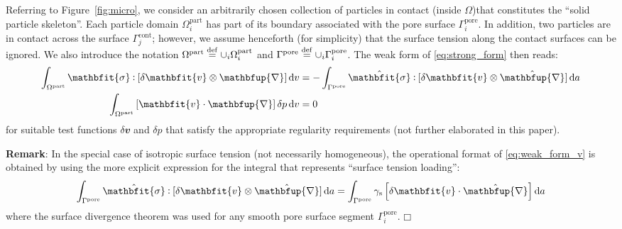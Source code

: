\documentclass[12pt,a4paper,fleqn]{article}
\renewcommand{\ta}[1]{\mathbfit{#1}}
\renewcommand{\ts}[1]{\mathbfit{#1}}
\renewcommand{\diff}{\mathbfup{\nabla}}
\renewcommand{\Box}{\mdlgwhtsquare}
\newcommand{\figref}[1]{Figure~\ref{#1}}
\newcommand{\pore}{\mathrm{pore}}
\newcommand{\particle}{\mathrm{part}}
\newcommand{\contact}{\mathrm{cont}}
\newcommand{\internal}{\mathrm{int}}
\newcommand{\surf}{\mathrm{s}}
\begin{document}

Referring to \figref{fig:micro}, we consider an arbitrarily chosen collection of particles in contact (inside $\Omega$)that constitutes the ``solid particle skeleton''.
Each particle domain $\Omega_i^\particle$ has part of its boundary associated with the pore surface $\Gamma_i^\pore$.
In addition, two particles are in contact across the surface $\Gamma_j^\contact$; however, we assume henceforth (for simplicity) that the surface tension along the contact surfaces can be ignored. We also introduce the notation $\Omega^\particle \defeq\cup_i\Omega_i^\particle$ and $\Gamma^\pore \defeq \cup_i\Gamma^\pore_i$.
The weak form of \eqref{eq:strong_form} then reads:
\begin{subequations}\label{eq:weak_form}
\begin{align}
    \int_{\Omega^\particle} \ts{\sigma}\dprod[\delta \ta v\outerp\diff] \dif v
    & =
    -\int_{\Gamma^\pore} \hat{\ts\sigma} \dprod [\delta\ta{v}\outerp\hat{\diff}] \dif a
\label{eq:weak_form_v} \\
    \int_{\Omega^\particle} \left[\ta{v}\cdot\diff\right] \delta p \dif v
    & =  0
\label{eq:weak_form_p}
\end{align}
\end{subequations}
for suitable test functions $\delta\ta{v}$ and $\delta p$ that satisfy the appropriate regularity requirements (not further elaborated in this paper).

\textbf{Remark}: In the special case of isotropic surface tension (not necessarily homogeneous), the operational format of \eqref{eq:weak_form_v} is obtained by using the more explicit expression for the integral that represents ``surface tension loading'':
\begin{equation}
    \int_{\Gamma^\pore} \hat{\ts\sigma} \dprod [\delta\ta{v}\outerp\hat{\diff}] \dif a =
    \int_{\Gamma^\pore} \gamma_\surf\left[\delta\ta{v}\cdot\hat{\diff}\right] \dif a
\label{eq:surface_traction_weak}
\end{equation}
where the surface divergence theorem was used for any smooth pore surface segment $\Gamma^\pore_i$. $\Box$
\end{document}
